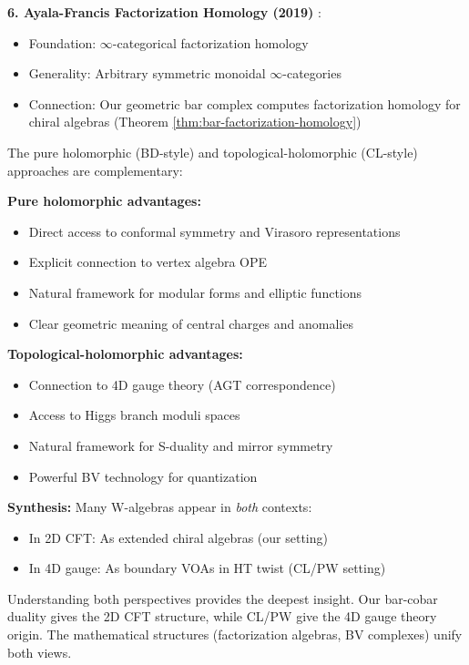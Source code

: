 \begin{remark}
\textbf{6. Ayala-Francis Factorization Homology (2019)} \cite{AF19}:
\begin{itemize}
\item Foundation: $\infty$-categorical factorization homology
\item Generality: Arbitrary symmetric monoidal $\infty$-categories
\item Connection: Our geometric bar complex computes factorization 
      homology for chiral algebras (Theorem \ref{thm:bar-factorization-homology})
\end{itemize}
\end{remark}

\begin{remark}\label{rem:complementary-approaches}
The pure holomorphic (BD-style) and topological-holomorphic (CL-style) approaches 
are complementary:

\textbf{Pure holomorphic advantages:}
\begin{itemize}
\item Direct access to conformal symmetry and Virasoro representations
\item Explicit connection to vertex algebra OPE
\item Natural framework for modular forms and elliptic functions
\item Clear geometric meaning of central charges and anomalies
\end{itemize}

\textbf{Topological-holomorphic advantages:}
\begin{itemize}
\item Connection to 4D gauge theory (AGT correspondence)
\item Access to Higgs branch moduli spaces
\item Natural framework for S-duality and mirror symmetry
\item Powerful BV technology for quantization
\end{itemize}

\textbf{Synthesis:} Many W-algebras appear in \emph{both} contexts:
\begin{itemize}
\item In 2D CFT: As extended chiral algebras (our setting)
\item In 4D gauge: As boundary VOAs in HT twist (CL/PW setting)
\end{itemize}

Understanding both perspectives provides the deepest insight. Our bar-cobar duality 
gives the 2D CFT structure, while CL/PW give the 4D gauge theory origin. The 
mathematical structures (factorization algebras, BV complexes) unify both views.
\end{remark}


